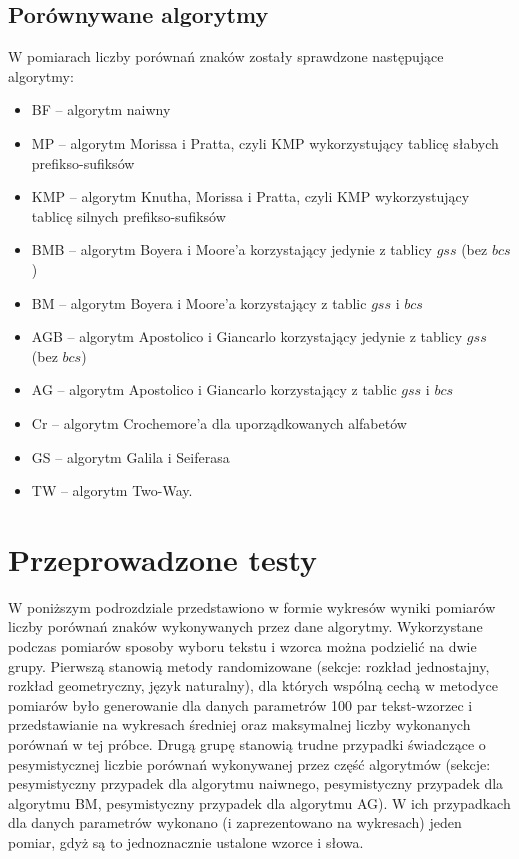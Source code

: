 \subsection{Porównywane algorytmy}
W pomiarach liczby porównań znaków zostały sprawdzone następujące algorytmy:
\begin{itemize}
  \item BF -- algorytm naiwny
  \item MP -- algorytm Morissa i Pratta, czyli KMP wykorzystujący tablicę słabych prefikso-sufiksów
  \item KMP -- algorytm Knutha, Morissa i Pratta, czyli KMP wykorzystujący tablicę silnych prefikso-sufiksów
  \item BMB -- algorytm Boyera i Moore’a korzystający jedynie z tablicy $gss$ (bez $bcs$)
  \item BM -- algorytm Boyera i Moore’a korzystający z tablic $gss$ i $bcs$
  \item AGB -- algorytm Apostolico i Giancarlo korzystający jedynie z tablicy $gss$ (bez $bcs$)
  \item AG -- algorytm Apostolico i Giancarlo korzystający z tablic $gss$ i $bcs$
  \item Cr -- algorytm Crochemore'a dla uporządkowanych alfabetów
  \item GS -- algorytm Galila i Seiferasa
  \item TW -- algorytm Two-Way.
\end{itemize}

\section{Przeprowadzone testy}
W poniższym podrozdziale przedstawiono w formie wykresów wyniki pomiarów liczby porównań znaków wykonywanych przez dane algorytmy. Wykorzystane podczas pomiarów sposoby wyboru tekstu i wzorca można podzielić na dwie grupy. Pierwszą stanowią metody randomizowane (sekcje: rozkład jednostajny, rozkład geometryczny, język naturalny), dla których wspólną cechą w metodyce pomiarów było generowanie dla danych parametrów 100 par tekst-wzorzec i przedstawianie na wykresach średniej oraz maksymalnej liczby wykonanych porównań w tej próbce. Drugą grupę stanowią trudne przypadki świadczące o pesymistycznej liczbie porównań wykonywanej przez część algorytmów (sekcje: pesymistyczny przypadek dla algorytmu naiwnego, pesymistyczny przypadek dla algorytmu BM, pesymistyczny przypadek dla algorytmu AG). W ich przypadkach dla danych parametrów wykonano (i zaprezentowano na wykresach) jeden pomiar, gdyż są to jednoznacznie ustalone wzorce i słowa.

